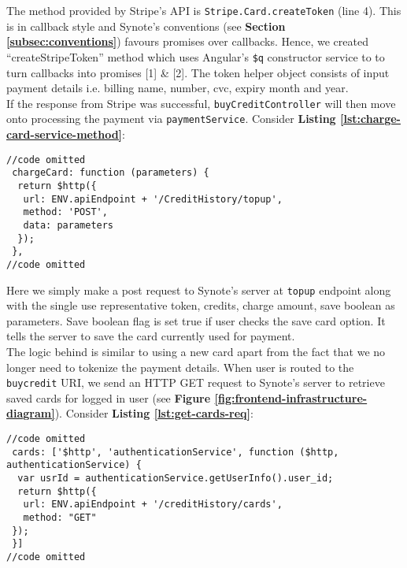 The method provided by Stripe’s API is \texttt{Stripe.Card.createToken} (line 4). This is in callback style and Synote’s conventions (see \textbf{Section \ref{subsec:conventions}}) favours promises over callbacks. Hence, we created “createStripeToken” method which uses Angular’s \texttt{\$q} constructor service to to turn callbacks into promises [1] \& [2]. The token helper object consists of input payment details i.e. billing name, number, cvc, expiry month and year.\\

If the response from Stripe was successful, \texttt{buyCreditController} will then move onto processing the payment via \texttt{paymentService}. Consider \textbf{Listing \ref{lst:charge-card-service-method}}:\\

\begin{listing}[H]
\begin{verbatim}
//code omitted
 chargeCard: function (parameters) {
  return $http({
   url: ENV.apiEndpoint + '/CreditHistory/topup',
   method: 'POST',
   data: parameters
  });
 },
//code omitted
\end{verbatim}
\label{lst:charge-card-service-method}
\end{listing}

Here we simply make a post request to Synote’s server at \texttt{topup} endpoint along with the single use representative token, credits, charge amount, save boolean as parameters. Save boolean flag is set true if user checks the save card option. It tells the server to save the card currently used for payment.\\

The logic behind is similar to using a new card apart from the fact that we no longer need to tokenize the payment details. When user is routed to the \texttt{buycredit} URI, we send an HTTP GET request to Synote’s server to retrieve saved cards for logged in user (see \textbf{Figure \ref{fig:frontend-infrastructure-diagram}}). Consider \textbf{Listing \ref{lst:get-cards-req}}:\\

\begin{listing}[H]
\begin{verbatim}
//code omitted
 cards: ['$http', 'authenticationService', function ($http, authenticationService) {
  var usrId = authenticationService.getUserInfo().user_id;
  return $http({
   url: ENV.apiEndpoint + '/creditHistory/cards',
   method: "GET"
 });
 }]
//code omitted
\end{verbatim}
\label{lst:get-cards-req}
\end{listing}

